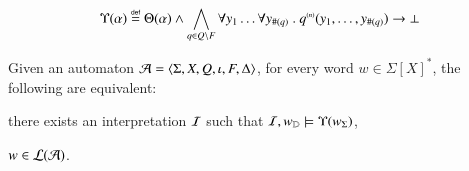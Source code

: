 \documentclass{llncs}
\begin{document}
\[\Upsilon({\alpha}) \stackrel{\scriptscriptstyle{\mathsf{def}}}{=} \Theta({\alpha}) \wedge \bigwedge_{q
  \in Q \setminus F} \forall y_1 \ldots \forall y_{\#(q)} ~.~
{q}^{\scriptscriptstyle{({n})}}(y_1,\ldots,y_{\#(q)}) \rightarrow \bot\]

\begin{lemma}\label{lemma:acceptance}
  Given an automaton $\mathcal{A} = \langle \Sigma,X,Q,\iota,F,\Delta \rangle$, for
  every word $w \in \Sigma[X]^*$, the following are
  equivalent: \begin{compactenum}
  \item\label{it1:lemma:acceptance} there exists an interpretation
    $\mathcal{I}$ such that $\mathcal{I},w_{\mathbb{D}} \models \Upsilon({w_\Sigma})$, 
  \item\label{it2:lemma:acceptance} $w \in {\mathcal L}({\mathcal{A}})$. 
  \end{compactenum}
\end{lemma}
\end{document}
